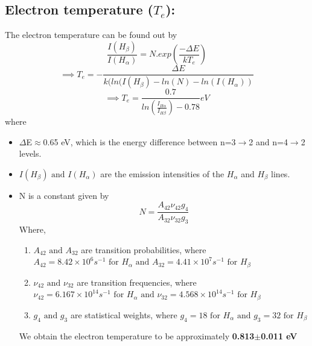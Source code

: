 \documentclass[]{report}[12 pt]
\begin{document}
\subsection*{Electron temperature ($T_e$):}
The electron temperature can be found out by
\[\frac{I(H_\beta)}{I(H_\alpha)}=N.exp(\frac{-\Delta E}{kT_e})\]
\[\implies T_e = -\frac{\Delta E}{k(ln(I(H_\beta)-ln(N)-ln(I(H_\alpha))}\]
\[\implies T_e=\frac{0.7}{ln(\frac{I_{H\alpha}}{I_{H\beta}})-0.78} eV\]
where
\begin{itemize}
	\item $\Delta$E$\approx$0.65 eV, which is the energy difference between n=3$\rightarrow$2 and n=4$\rightarrow$2 levels.
	\item $I(H_\beta)\text{ and }I(H_\alpha)$ are the emission intensities of the $H_\alpha$ and $H_\beta$ lines.
	\item N is a constant given by 
	\[ N= \frac{A_{42}\nu_{42}g_4}{A_{32}\nu_{32}g_3}\]
	Where,
	\begin{enumerate}
		\item $A_{42} \text{ and }A_{32}$ are transition probabilities, where $A_{42} = 8.42 \times 10^{6} s^{-1}  \text{ for } H_\alpha \text{ and } A_{32} = 4.41 \times 10^{7} s^{-1} \text{ for } H_\beta$ 
		\item $\nu_{42} \text{ and }\nu_{32}$ are transition frequencies, where  $\nu_{42} = 6.167 \times 10^{14} s^{-1}  \text{ for } H_\alpha \text{ and } \nu_{32} = 4.568 \times 10^{14} s^{-1} \text{ for } H_\beta$
		\item $g_{4} \text{ and }g_{3}$ are statistical weights, where  $g_{4} = 18 \text{ for } H_\alpha \text{ and } g_{3} = 32 \text{ for } H_\beta$
	\end{enumerate}
	
We obtain the electron temperature to be approximately \textbf{0.813$\pm$0.011 eV}

\end{itemize}
\end{document}
